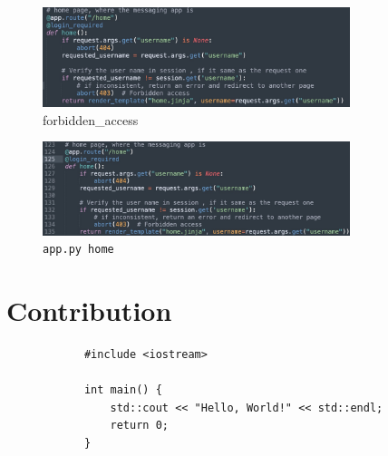 \documentclass[12pt]{article}
\begin{document}
        \begin{figure}[H]
            \centering
            \includegraphics[width=0.8\textwidth]{graphs/forbidden_access.jpg}
            \caption{forbidden\_access}
            \label{forbidden access}{}
        \end{figure}


        \begin{figure}[H]
            \centering
            \includegraphics[width=0.8\textwidth]{graphs/home_session.jpg}
            \caption{\texttt{app.py home}}
            \label{home session}
        \end{figure}

\section{Contribution}

        \begin{verbatim}
            #include <iostream>

            int main() {
                std::cout << "Hello, World!" << std::endl;
                return 0;
            }
        \end{verbatim}
\end{document}
